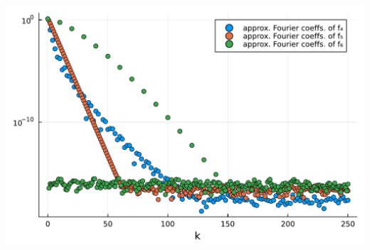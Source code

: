 \documentclass[12pt,landscape]{article}
\begin{document}
{\includegraphics[width=\linewidth]{jl_qsW2Qg/Fourier_26_1.pdf}

}
\end{document}
